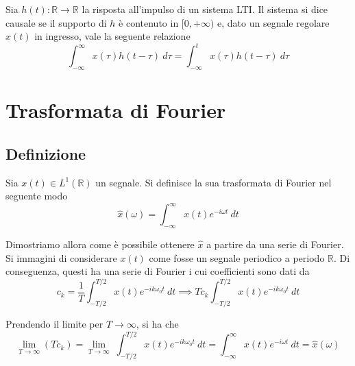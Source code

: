    \begin{definition}
        Sia $h(t): \mathbb{R} \rightarrow \mathbb{R}$ la risposta all'impulso di un sistema LTI.
        Il sistema si dice causale se il supporto di $h$ è contenuto in $[0, +\infty)$ e, dato un segnale regolare $x(t)$ in ingresso, vale la seguente relazione
        \[
            \int_{-\infty}^{\infty} x(\tau) h(t - \tau) \: d\tau = \int_{-\infty}^{t} x(\tau) h(t - \tau) \: d\tau
        \]
    \end{definition}



\section{Trasformata di Fourier}
    \subsection{Definizione}
    Sia $x(t) \in L^{1}(\mathbb{R})$ un segnale.
    Si definisce la sua trasformata di Fourier nel seguente modo
    \[
        \hat{x}(\omega) = \int_{-\infty}^{\infty} x(t)e^{-i \omega t} \: dt
    \]

    Dimostriamo allora come è possibile ottenere $\hat{x}$ a partire da una serie di Fourier.
    Si immagini di considerare $x(t)$ come fosse un segnale periodico a periodo $\mathbb{R}$.
    Di conseguenza, questi ha una serie di Fourier i cui coefficienti sono dati da
    \[
        c_{k} = \frac{1}{T} \int_{-T/2}^{T/2} x(t) e^{-i k \omega_{0} t} \: dt \implies T c_{k} \int_{-T/2}^{T/2} x(t) e^{-i k \omega_{0} t} \: dt
    \]

    Prendendo il limite per $T \rightarrow \infty$, si ha che
    \[
        \lim_{T \rightarrow \infty} (T c_{k}) = \lim_{T \rightarrow \infty} \; \int_{-T/2}^{T/2} x(t) e^{-i k \omega_{0} t} \: dt = \int_{-\infty}^{\infty} x(t) e^{-i \omega t} \: dt = \hat{x}(\omega)
    \]


